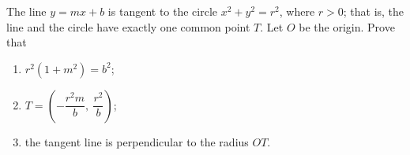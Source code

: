 The line $y=mx+b$ is tangent to the circle $x^2+y^2=r^2$, where $r>0$; that is, the line and the circle have exactly one common point $T$. Let $O$ be the origin. Prove that
\begin{enumerate}
\item[(a)] $r^2\left(1+m^2\right)=b^2$;
\item[(b)] $T=\left(-\dfrac{r^2m}{b},\ \dfrac{r^2}{b}\right)$;
\item[(c)] the tangent line is perpendicular to the radius $OT$.
\end{enumerate}
